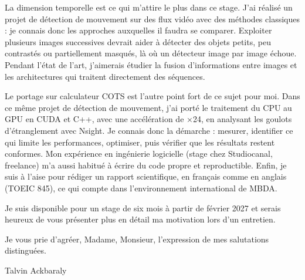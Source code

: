 \documentclass[11pt, a4paper]{extarticle}
\begin{document}
La dimension temporelle est ce qui m'attire le plus dans ce stage. J'ai réalisé un projet de
détection de mouvement sur des flux vidéo avec des méthodes classiques : je connais donc les
approches auxquelles il faudra se comparer. Exploiter plusieurs images successives devrait aider
à détecter des objets petits, peu contrastés ou partiellement masqués, là où un détecteur image
par image échoue. Pendant l'état de l'art, j'aimerais étudier la fusion d'informations entre
images et les architectures qui traitent directement des séquences.

Le portage sur calculateur COTS est l'autre point fort de ce sujet pour moi. Dans ce même projet
de détection de mouvement, j'ai porté le traitement du CPU au GPU en CUDA et C++, avec une
accélération de ×24, en analysant les goulots d'étranglement avec Nsight. Je connais donc la
démarche : mesurer, identifier ce qui limite les performances, optimiser, puis vérifier que les
résultats restent conformes. Mon expérience en ingénierie logicielle (stage chez Studiocanal,
freelance) m'a aussi habitué à écrire du code propre et reproductible. Enfin, je suis à l'aise pour rédiger un rapport scientifique, en
français comme en anglais (TOEIC 845), ce qui compte dans l'environnement international de MBDA.

Je suis disponible pour un stage de six mois à partir de février 2027 et serais heureux de vous
présenter plus en détail ma motivation lors d'un entretien.

Je vous prie d'agréer, Madame, Monsieur, l'expression de mes salutations distinguées.

\vspace{10pt}
\hfill Talvin Ackbaraly\hspace*{1cm}
\end{document}
